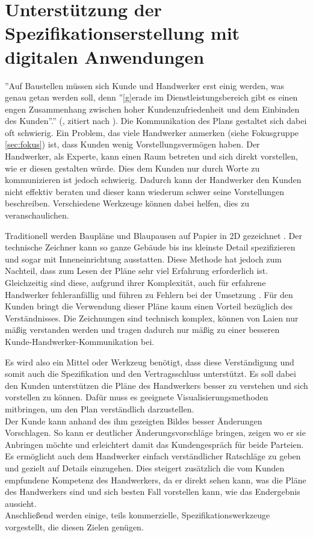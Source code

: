\section{Unterstützung der Spezifikationserstellung mit digitalen Anwendungen}
\label{sec:spezi}

''Auf Baustellen müssen sich Kunde und Handwerker erst einig werden, was genau getan werden soll, denn ''[g]erade im Dienstleistungsbereich gibt es einen engen Zusammenhang zwischen hoher Kundenzufriedenheit und dem Einbinden des Kunden''.'' (\cite{klinker_fliesen_2019}, zitiert nach \cite{hentrich_arbeiten_2002}). Die Kommunikation des Plans gestaltet sich dabei oft schwierig. Ein Problem, das viele Handwerker anmerken (siehe Fokusgruppe \ref{sec:fokus}) ist, dass Kunden wenig Vorstellungsvermögen haben. Der Handwerker, als Experte, kann einen Raum betreten und sich direkt vorstellen, wie er diesen gestalten würde. Dies dem Kunden nur durch Worte zu kommunizieren ist jedoch schwierig. Dadurch kann der Handwerker den Kunden nicht effektiv beraten und dieser kann wiederum schwer seine Vorstellungen beschreiben. Verschiedene Werkzeuge können dabei helfen, dies zu veranschaulichen.

Traditionell werden Baupläne und Blaupausen auf Papier in 2D gezeichnet \cite{klinker_fliesen_2019}. Der technische Zeichner kann so ganze Gebäude bis ins kleinste Detail spezifizieren und sogar mit Inneneinrichtung ausstatten. Diese Methode hat jedoch zum Nachteil, dass zum Lesen der Pläne sehr viel Erfahrung erforderlich ist. Gleichzeitig sind diese, aufgrund ihrer Komplexität, auch für erfahrene Handwerker fehleranfällig und führen zu Fehlern bei der Umsetzung \cite{wang_using_2007}. Für den Kunden bringt die Verwendung dieser Pläne kaum einen Vorteil bezüglich des Verständnisses. Die Zeichnungen sind technisch komplex, können von Laien nur mäßig verstanden werden und tragen dadurch nur mäßig zu einer besseren Kunde-Handwerker-Kommunikation bei.

Es wird also ein Mittel oder Werkzeug benötigt, dass diese Verständigung und somit auch die Spezifikation und den Vertragsschluss unterstützt. Es soll dabei den Kunden unterstützen die Pläne des Handwerkers besser zu verstehen und sich vorstellen zu können. Dafür muss es geeignete Visualisierungsmethoden mitbringen, um den Plan verständlich darzustellen. \\
Der Kunde kann anhand des ihm gezeigten Bildes besser Änderungen Vorschlagen. So kann er deutlicher Änderungsvorschläge bringen, zeigen wo er sie Anbringen möchte und erleichtert damit das Kundengespräch für beide Parteien. \\
Es ermöglicht auch dem Handwerker einfach verständlicher Ratschläge zu geben und gezielt auf Details einzugehen. Dies steigert zusätzlich die vom Kunden empfundene Kompetenz des Handwerkers, da er direkt sehen kann, was die Pläne des Handwerkers sind und sich besten Fall vorstellen kann, wie das Endergebnis aussieht. \\
Anschließend werden einige, teils kommerzielle, Spezifikationswerkzeuge vorgestellt, die diesen Zielen genügen.

